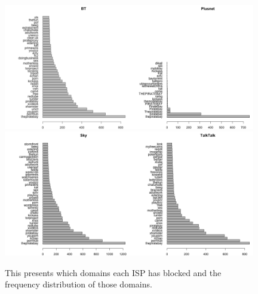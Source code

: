 \documentclass{bmcart}
\begin{document}
\begin{figure}[h!]
\caption{ This presents which domains each ISP has blocked and the frequency distribution of those domains.}
\includegraphics[width=0.49\textwidth]{imgs/BT-blocked-pages-to-date}\includegraphics[width=0.49\textwidth]{imgs/Plusnet-blocked-pages-to-date}
\includegraphics[width=0.49\textwidth]{imgs/Sky-blocked-pages-to-date.png}\includegraphics[width=0.49\textwidth]{imgs/TalkTalk-blocked-pages-to-date}

\end{figure}
\end{document}
